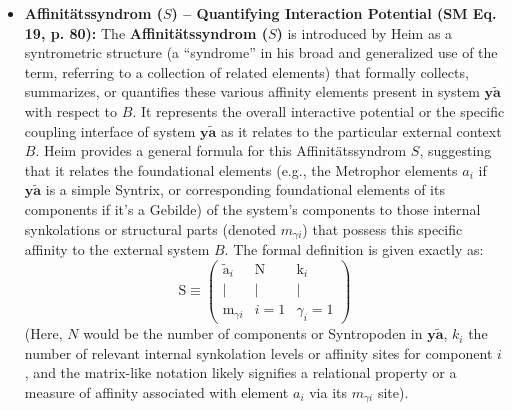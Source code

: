 \documentclass[12pt]{article}
\newcommand{\q}[1]{\enquote{#1}}
\newcommand{\affinitaetssyndrom}{S}
\begin{document}
\begin{itemize}
    \item \textbf{Affinitätssyndrom (\( \affinitaetssyndrom \)) – Quantifying Interaction Potential (SM Eq. 19, p. 80):}
    The \textbf{Affinitätssyndrom (\( \affinitaetssyndrom \))} is introduced by Heim as a syntrometric structure (a \q{syndrome} in his broad and generalized use of the term, referring to a collection of related elements) that formally collects, summarizes, or quantifies these various affinity elements present in system \( \mathbf{y\widetilde{a}} \) with respect to \( B \). It represents the overall interactive potential or the specific coupling interface of system \( \mathbf{y\widetilde{a}} \) as it relates to the particular external context \( B \). Heim provides a general formula for this Affinitätssyndrom \( \affinitaetssyndrom \), suggesting that it relates the foundational elements (e.g., the Metrophor elements \( a_i \) if \( \mathbf{y\widetilde{a}} \) is a simple Syntrix, or corresponding foundational elements of its components if it's a Gebilde) of the system's components to those internal synkolations or structural parts (denoted \( m_{\gamma i} \)) that possess this specific affinity to the external system \( B \). The formal definition is given exactly as:
    \begin{equation}
\mathrm{S} \equiv \begin{pmatrix} \tilde{\mathrm{a}}_i & \mathrm{N} & \mathrm{k}_i \\ | & | & | \\ \mathrm{m}_{\gamma i} & i=1 & \gamma_i=1 \end{pmatrix}
\label{eq:original_affinitaetssyndrom_general}
\end{equation}
    (Here, \( N \) would be the number of components or Syntropoden in \( \mathbf{y\widetilde{a}} \), \( k_i \) the number of relevant internal synkolation levels or affinity sites for component \(i\), and the matrix-like notation likely signifies a relational property or a measure of affinity associated with element \(a_i\) via its \(m_{\gamma i}\) site).


\end{itemize}
\end{document}
